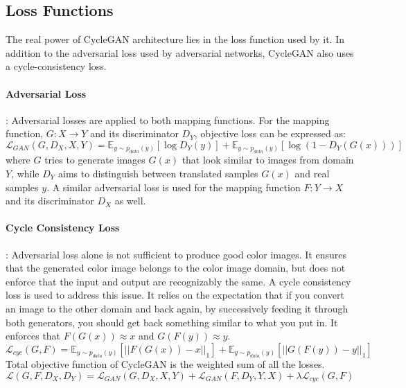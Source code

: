 \documentclass{article} %
\begin{document}
\subsection{Loss Functions}
The real power of CycleGAN architecture lies in the loss function used by it. In addition to the adversarial loss used by adversarial networks\cite{gan}, CycleGAN also uses a cycle-consistency loss.

\paragraph{Adversarial Loss}: Adversarial losses are applied to both mapping functions. For the mapping function, $G : X \rightarrow Y$ and its discriminator $D_Y$, objective loss can be expressed as:\\
\begin{equation}
    \mathcal{L}_{GAN}(G,D_X,X,Y) = \mathbb{E}_{y\sim p_{data}(y)}\left[\log D_Y(y)\right] + \mathbb{E}_{y\sim p_{data}(y)}\left[\log (1-D_Y(G(x)))\right]
\end{equation}
\newline
where $G$ tries to generate images $G(x)$ that look similar to images from domain $Y$, while $D_Y$ aims to distinguish between translated samples $G(x)$ and real samples $y$. A similar adversarial loss is used for the mapping function $F : Y \rightarrow X$ and its discriminator $D_X$ as well.
\paragraph{Cycle Consistency Loss}: Adversarial loss alone is not sufficient to produce good color images. It ensures that the generated color image belongs to the color image domain, but does not enforce that the input and output are recognizably the same. A cycle consistency loss is used to address this issue. It relies on the expectation that if you convert an image to the other domain and back again, by successively feeding it through both generators, you should get back something similar to what you put in. It enforces that $F(G(x)) ≈ x$ and $G(F(y)) ≈ y$.\\
\begin{equation}\label{eq:cycle_const}
    \mathcal{L}_{cyc}(G,F) = \mathbb{E}_{y\sim p_{data}(y)}\left[|| F(G(x)) - x||_1 \right] + \mathbb{E}_{y\sim p_{data}(y)}\left[|| G(F(y)) - y||_1 \right]
\end{equation}
\newline
Total objective function of CycleGAN is the weighted sum of all the losses.
\newline
\begin{equation}
    \mathcal{L}(G,F,D_X, D_Y) = \mathcal{L}_{GAN}(G,D_X,X,Y) + \mathcal{L}_{GAN}(F,D_Y,Y,X) + \lambda\mathcal{L}_{cyc}(G,F)
\end{equation}
\end{document}
